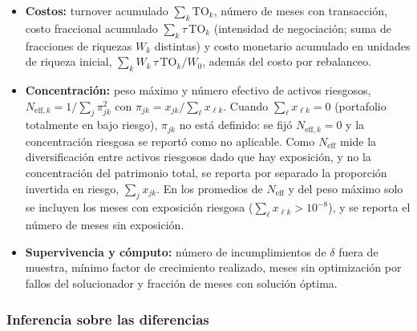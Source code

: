 \begin{itemize}
    \item \textbf{Costos:} 
turnover acumulado $\sum_k\mathrm{TO}_k$, número de meses con transacción, costo fraccional acumulado $\sum_k\tau\,\mathrm{TO}_k$ (intensidad de negociación; suma de fracciones de riquezas $W_k$ distintas) y costo monetario acumulado en unidades de riqueza inicial, $\sum_k W_k\,\tau\,\mathrm{TO}_k/W_0$, además del costo por rebalanceo.

    \item \textbf{Concentración:} 
peso máximo y número efectivo de activos riesgosos, $N_{\mathrm{eff},k}=1/\sum_{j}\pi_{jk}^2$ con $\pi_{jk}=x_{jk}/\sum_{\ell}x_{\ell k}$. Cuando $\sum_\ell x_{\ell k}=0$ (portafolio totalmente en bajo riesgo), $\pi_{jk}$ no está definido: se fijó $N_{\mathrm{eff},k}=0$ y la concentración riesgosa se reportó como no aplicable. Como $N_{\mathrm{eff}}$ mide la diversificación entre activos riesgosos dado que hay exposición, y no la concentración del patrimonio total, se reporta por separado la proporción invertida en riesgo, $\sum_j x_{jk}$. En los promedios de $N_{\mathrm{eff}}$ y del peso máximo solo se incluyen los meses con exposición riesgosa ($\sum_\ell x_{\ell k}>10^{-8}$), y se reporta el número de meses sin exposición.

    \item \textbf{Supervivencia y cómputo:} número de incumplimientos de $\delta$ fuera de muestra, mínimo factor de crecimiento realizado, meses sin optimización por fallos del solucionador y fracción de meses con solución óptima.
\end{itemize}

\subsubsection{Inferencia sobre las diferencias}

